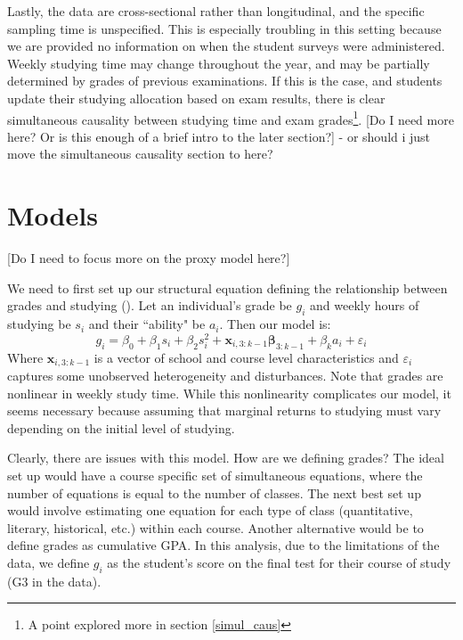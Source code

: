\documentclass[12pt]{article}
\begin{document}
Lastly, the data are cross-sectional rather than longitudinal, and the specific sampling time is unspecified. This is especially troubling in this setting because we are provided no information on when the student surveys were administered. Weekly studying time may change throughout the year, and may be partially determined by grades of previous examinations. If this is the case, and students update their studying allocation based on exam results, there is clear simultaneous causality between studying time and exam grades\footnote{A point explored more in section \ref{simul_caus}}. 
\textcolor{BrickRed}{[Do I need more here? Or is this enough of a brief intro to the later section?] - or should i just move the simultaneous causality section to here?}


\newpage
\section{Models} \label{models}
\textcolor{BrickRed}{[Do I need to focus more on the proxy model here?]}

We need to first set up our structural equation defining the relationship between grades and studying (\cite{CardKrueger}). Let an individual's grade be $g_i$ and weekly hours of studying be $s_i$ and their ``ability" be $a_i$. Then our model is:
$$
g_i = \beta_0 + \beta_1 s_i + \beta_2 s_i^2  + \bm{x}_{i,3:k-1}\bm{\beta}_{3:k-1} + \beta_k a_i + \varepsilon_i
$$
Where $\bm{x}_{i,3:k-1}$ is a vector of school and course level characteristics and $\varepsilon_i$ captures some unobserved heterogeneity and disturbances. Note that grades are nonlinear in weekly study time. While this nonlinearity complicates our model, it seems necessary because assuming that marginal returns to studying must vary depending on the initial level of studying.

Clearly, there are issues with this model. How are we defining grades? The ideal set up would have a course specific set of simultaneous equations, where the number of equations is equal to the number of classes. The next best set up would involve estimating one equation for each type of class (quantitative, literary, historical, etc.) within each course. Another alternative would be to define grades as cumulative GPA. In this analysis, due to the limitations of the data, we define $g_i$ as the student's score on the final test for their course of study (G3 in the data).
\end{document}
